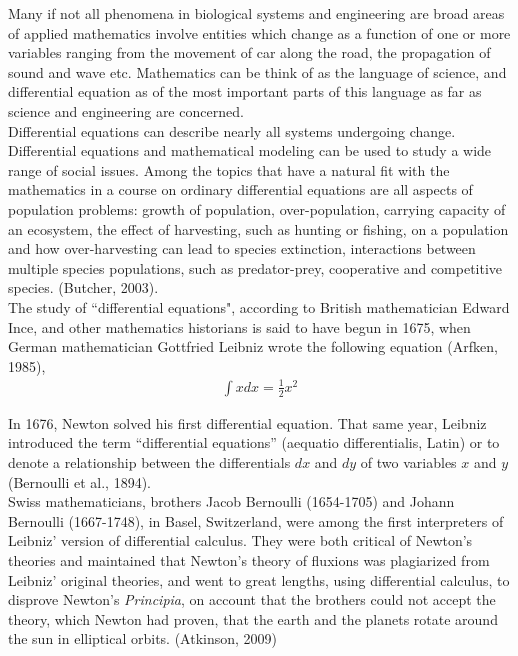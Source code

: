 \documentclass[11pt]{report}
\newcommand{\NI}{\noindent}
\begin{document}
	\NI Many if not all phenomena in biological systems and engineering are broad areas of applied mathematics involve entities which change as a function of one or more variables ranging from the movement of car along the road, the propagation of sound and wave etc. Mathematics can be think of as the language of science, and differential equation as of the most important parts of this language as far as science and engineering are concerned.\\ 
	
	\NI Differential equations can describe nearly all systems undergoing change. Differential equations and mathematical modeling can be used to study a wide range of social issues. Among the topics that have a natural fit with the mathematics in a course on ordinary differential equations are all aspects of population problems: growth of population, over-population, carrying capacity of an ecosystem, the effect of harvesting, such as hunting or fishing, on a population and how over-harvesting can lead to species extinction, interactions between multiple species populations, such as predator-prey, cooperative and competitive species. (Butcher, 2003).\\
	
	\NI The study of ``differential equations", according to British mathematician Edward Ince, and other mathematics historians is said to have begun in 1675, when German mathematician Gottfried Leibniz wrote the following equation (Arfken, 1985),
	\begin{eqnarray*}
		\int x dx = \frac{1}{2}x^2
	\end{eqnarray*}
	
	\NI In 1676, Newton solved his first differential equation. That same year, Leibniz introduced the term ``differential equations” (aequatio differentialis, Latin) or to denote a relationship between the differentials $dx$ and $dy$ of two variables $x$ and $y$(Bernoulli et al., 1894).\\
	
	\NI Swiss mathematicians, brothers Jacob Bernoulli (1654-1705) and Johann Bernoulli (1667-1748), 
	in Basel, Switzerland, were among the first interpreters of Leibniz' version of differential calculus. They were both critical of Newton's theories and maintained that Newton’s theory of fluxions was plagiarized from Leibniz' original theories, and went to great lengths, using differential calculus, to disprove Newton’s \emph{Principia}, on account that the brothers could not accept the theory, which Newton had proven, that the earth and the planets rotate around the sun in elliptical orbits. (Atkinson, 2009)\\
	
\end{document}
